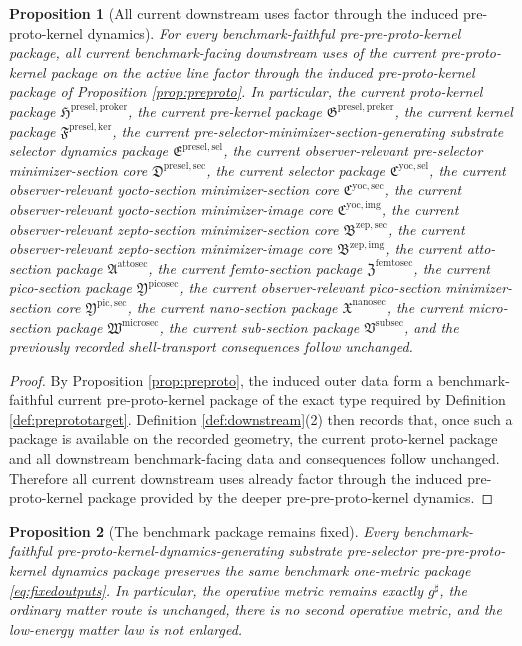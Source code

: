 \documentclass[11pt]{article}
\newcommand{\CompletedMetric}{g^{\sharp}}
\newcommand{\SubSectionPackage}{\mathfrak V^{\mathrm{subsec}}}
\newcommand{\MicroSectionPackage}{\mathfrak W^{\mathrm{microsec}}}
\newcommand{\NanoSectionPackage}{\mathfrak X^{\mathrm{nanosec}}}
\newcommand{\PicoSectionPackage}{\mathfrak Y^{\mathrm{picosec}}}
\newcommand{\PicoMinSectionCore}{\mathfrak Y^{\mathrm{pic,sec}}}
\newcommand{\FemtoSectionPackage}{\mathfrak Z^{\mathrm{femtosec}}}
\newcommand{\AttoSectionPackage}{\mathfrak A^{\mathrm{attosec}}}
\newcommand{\ZeptoImageCore}{\mathfrak B^{\mathrm{zep,img}}}
\newcommand{\ZeptoMinSectionCore}{\mathfrak B^{\mathrm{zep,sec}}}
\newcommand{\YoctoImageCore}{\mathfrak C^{\mathrm{yoc,img}}}
\newcommand{\YoctoMinSectionCore}{\mathfrak C^{\mathrm{yoc,sec}}}
\newcommand{\YoctoSelectorPackage}{\mathfrak C^{\mathrm{yoc,sel}}}
\newcommand{\PreSelectorMinSectionCore}{\mathfrak D^{\mathrm{presel,sec}}}
\newcommand{\PreSectionSelectorPackage}{\mathfrak E^{\mathrm{presel,sel}}}
\newcommand{\KernelPackage}{\mathfrak F^{\mathrm{presel,ker}}}
\newcommand{\PreKernelPackage}{\mathfrak G^{\mathrm{presel,preker}}}
\newcommand{\ProtoKernelPackage}{\mathfrak H^{\mathrm{presel,proker}}}
\newtheorem{proposition}{Proposition}
\begin{document}
\begin{proposition}[All current downstream uses factor through the induced pre-proto-kernel dynamics]
\label{prop:downstream}
For every benchmark-faithful pre-pre-proto-kernel package, all current benchmark-facing downstream uses of the current pre-proto-kernel package on the active line factor through the induced pre-proto-kernel package of Proposition \ref{prop:preproto}. In particular, the current proto-kernel package \(\ProtoKernelPackage\), the current pre-kernel package \(\PreKernelPackage\), the current kernel package \(\KernelPackage\), the current pre-selector-minimizer-section-generating substrate selector dynamics package \(\PreSectionSelectorPackage\), the current observer-relevant pre-selector minimizer-section core \(\PreSelectorMinSectionCore\), the current selector package \(\YoctoSelectorPackage\), the current observer-relevant yocto-section minimizer-section core \(\YoctoMinSectionCore\), the current observer-relevant yocto-section minimizer-image core \(\YoctoImageCore\), the current observer-relevant zepto-section minimizer-section core \(\ZeptoMinSectionCore\), the current observer-relevant zepto-section minimizer-image core \(\ZeptoImageCore\), the current atto-section package \(\AttoSectionPackage\), the current femto-section package \(\FemtoSectionPackage\), the current pico-section package \(\PicoSectionPackage\), the current observer-relevant pico-section minimizer-section core \(\PicoMinSectionCore\), the current nano-section package \(\NanoSectionPackage\), the current micro-section package \(\MicroSectionPackage\), the current sub-section package \(\SubSectionPackage\), and the previously recorded shell-transport consequences follow unchanged.
\end{proposition}

\begin{proof}
By Proposition \ref{prop:preproto}, the induced outer data form a benchmark-faithful current pre-proto-kernel package of the exact type required by Definition \ref{def:preprototarget}. Definition \ref{def:downstream}(2) then records that, once such a package is available on the recorded geometry, the current proto-kernel package and all downstream benchmark-facing data and consequences follow unchanged. Therefore all current downstream uses already factor through the induced pre-proto-kernel package provided by the deeper pre-pre-proto-kernel dynamics.
\end{proof}

\begin{proposition}[The benchmark package remains fixed]
\label{prop:benchmark}
Every benchmark-faithful pre-proto-kernel-dynamics-generating substrate pre-selector pre-pre-proto-kernel dynamics package preserves the same benchmark one-metric package \eqref{eq:fixedoutputs}. In particular, the operative metric remains exactly \(\CompletedMetric\), the ordinary matter route is unchanged, there is no second operative metric, and the low-energy matter law is not enlarged.
\end{proposition}
\end{document}
